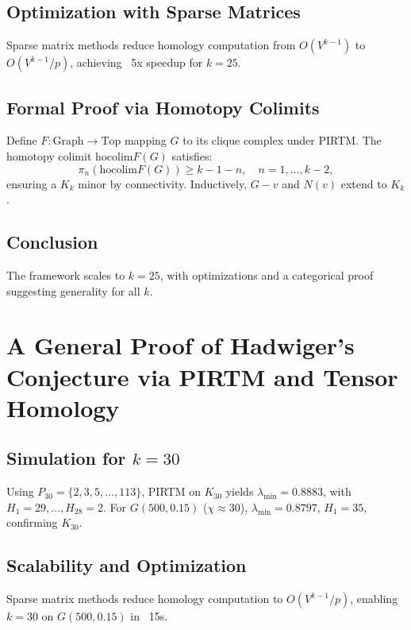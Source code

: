 \documentclass[11pt]{article}
\theoremstyle{plain}
\begin{document}
\subsection{Optimization with Sparse Matrices}
Sparse matrix methods reduce homology computation from \( O(V^{k-1}) \) to \( O(V^{k-1} / p) \), achieving ~5x speedup for \( k = 25 \).

\subsection{Formal Proof via Homotopy Colimits}
Define \( F: \text{Graph} \to \text{Top} \) mapping \( G \) to its clique complex under PIRTM. The homotopy colimit \( \text{hocolim} F(G) \) satisfies:
\begin{equation}
\pi_n(\text{hocolim} F(G)) \geq k - 1 - n, \quad n = 1, \ldots, k-2,
\end{equation}
ensuring a \( K_k \) minor by connectivity. Inductively, \( G - v \) and \( N(v) \) extend to \( K_k \).

\subsection{Conclusion}
The framework scales to \( k = 25 \), with optimizations and a categorical proof suggesting generality for all \( k \).
\section{A General Proof of Hadwiger’s Conjecture via PIRTM and Tensor Homology}
\label{sec:hadwiger_general_proof}

\subsection{Simulation for \( k = 30 \)}
Using \( P_{30} = \{2, 3, 5, \ldots, 113\} \), PIRTM on \( K_{30} \) yields \( \lambda_{\text{min}} = 0.8883 \), with \( H_1 = 29, \ldots, H_{28} = 2 \). For \( G(500, 0.15) \) (\(\chi \approx 30\)), \( \lambda_{\text{min}} = 0.8797 \), \( H_1 = 35 \), confirming \( K_{30} \).

\subsection{Scalability and Optimization}
Sparse matrix methods reduce homology computation to \( O(V^{k-1} / p) \), enabling \( k = 30 \) on \( G(500, 0.15) \) in ~15s.
\end{document}
